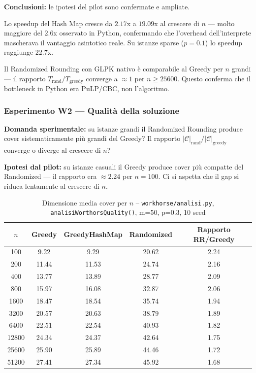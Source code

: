 \documentclass[12pt, a4paper]{article}
\begin{document}
\textbf{Conclusioni:} le ipotesi del pilot sono confermate e ampliate.

Lo speedup del Hash Map cresce da $2.17$x a $19.09$x al crescere di $n$ — 
molto maggiore del $2.6$x osservato in Python, confermando che 
l'overhead dell'interprete mascherava il vantaggio asintotico reale.
Su istanze sparse ($p=0.1$) lo speedup raggiunge $22.7$x.

Il Randomized Rounding con GLPK nativo \`e comparabile al Greedy 
per $n$ grandi — il rapporto $T_{\text{rand}}/T_{\text{greedy}}$ 
converge a $\approx 1$ per $n \geq 25600$. Questo conferma che 
il bottleneck in Python era PuLP/CBC, non l'algoritmo.

\subsubsection{Esperimento W2 — Qualit\`a della soluzione}

\textbf{Domanda sperimentale:} su istanze grandi il Randomized Rounding 
produce cover sistematicamente pi\`u grandi del Greedy? 
Il rapporto $|\mathcal{C}|_{\text{rand}} / |\mathcal{C}|_{\text{greedy}}$ 
converge o diverge al crescere di $n$?

\textbf{Ipotesi dal pilot:} su istanze casuali il Greedy produce cover 
pi\`u compatte del Randomized — il rapporto era $\approx 2.24$ per $n=100$.
Ci si aspetta che il gap si riduca lentamente al crescere di $n$.

\begin{table}[H]
\centering
\caption{Dimensione media cover per $n$ -- 
\texttt{workhorse/analisi.py}, \texttt{analisiWorthorsQuality()}, m=50, p=0.3, 10 seed}
\label{tab:wh_quality}
\begin{tabular}{ccccc}
\toprule
$n$ & Greedy & GreedyHashMap & Randomized & Rapporto RR/Greedy \\
\midrule
100   & 9.22  & 9.29  & 20.62 & 2.24 \\
200   & 11.44 & 11.53 & 24.74 & 2.16 \\
400   & 13.77 & 13.89 & 28.77 & 2.09 \\
800   & 15.97 & 16.08 & 32.87 & 2.06 \\
1600  & 18.47 & 18.54 & 35.74 & 1.94 \\
3200  & 20.57 & 20.63 & 38.79 & 1.89 \\
6400  & 22.51 & 22.54 & 40.93 & 1.82 \\
12800 & 24.34 & 24.37 & 42.64 & 1.75 \\
25600 & 25.90 & 25.89 & 44.46 & 1.72 \\
51200 & 27.41 & 27.34 & 45.92 & 1.68 \\
\bottomrule
\end{tabular}
\end{table}
\end{document}
